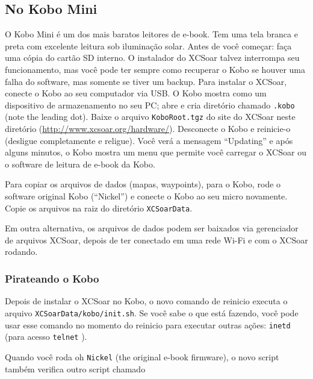 \subsection*{No Kobo Mini}

O Kobo Mini é um dos mais baratos leitores de e-book.  Tem uma tela branca e preta com excelente leitura sob iluminação solar.  
Antes de você começar: faça uma cópia do cartão SD interno.  O instalador do XCSoar talvez interrompa seu funcionamento, mas você pode ter sempre como recuperar o Kobo se houver uma falha do software, mas somente se tiver um backup.
Para instalar o XCSoar, conecte o Kobo ao seu computador via USB. O Kobo mostra como um dispositivo de armazenamento no seu PC; abre e cria diretório chamado \texttt{.kobo} (note the leading dot).  Baixe o arquivo \texttt{KoboRoot.tgz} do site do XCSoar neste diretório (\url{http://www.xcsoar.org/hardware/}). Desconecte o Kobo e reinicie-o (desligue completamente e religue).  Você verá a mensagem “Updating” e após alguns minutos, o Kobo mostra um menu que permite você carregar o XCSoar ou o software de leitura de e-book da Kobo.

Para copiar os arquivos de dados (mapas, waypoints), para o Kobo, rode o software original Kobo (“Nickel”) e conecte o Kobo ao seu micro novamente.  Copie os arquivos na raiz do diretório  \texttt{XCSoarData}.

Em outra alternativa, os arquivos de dados podem ser baixados via gerenciador de arquivos XCSoar, depois de ter conectado em uma rede Wi-Fi e com o XCSoar rodando.

\subsubsection{Pirateando o Kobo}

Depois de instalar o XCSoar no Kobo, o novo comando de reinicio executa o arquivo \texttt{XCSoarData/kobo/init.sh}.  Se você sabe o que está fazendo, você pode usar esse comando no momento do reinicio para executar outras ações: \texttt{inetd} (para acesso \texttt{telnet}
).

Quando você roda oh \texttt{Nickel} (the original e-book firmware), o novo script também verifica outro script chamado %

